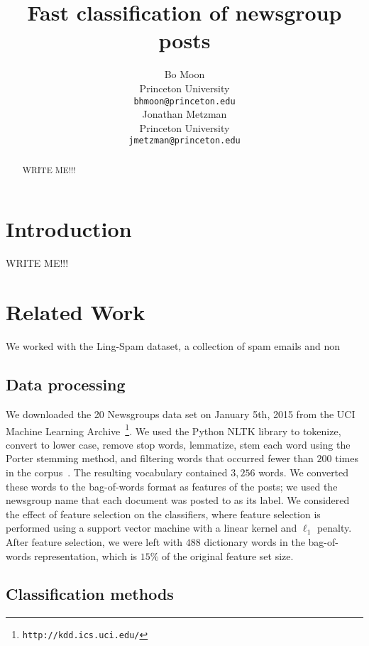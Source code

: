 \documentclass{article} %
\title{Fast classification of newsgroup posts}
\author{
Bo Moon\\
Princeton University\\
\texttt{bhmoon@princeton.edu} \\
\And
Jonathan Metzman\\
Princeton University \\
\texttt{jmetzman@princeton.edu} \\
}
\begin{document}
\maketitle

\begin{abstract}
WRITE ME!!!
\end{abstract}
\section{Introduction}
WRITE ME!!!
\section{Related Work}

We worked with the Ling-Spam dataset, a collection of spam emails and non


\subsection{Data processing}

We downloaded the 20 Newsgroups data set on January 5th, 2015 from the UCI Machine Learning Archive~\footnote{{\tt http://kdd.ics.uci.edu/}}. We used the Python NLTK library to tokenize, convert to lower case, remove stop words, lemmatize, stem each word using the Porter stemming method, and filtering words that occurred fewer than $200$ times in the corpus~\cite{bird2009}. The resulting vocabulary contained $3,256$ words. We converted these words to the bag-of-words format as features of the posts; we used the newsgroup name that each document was posted to as its label. We considered the effect of feature selection on the classifiers, where feature selection is performed using a support vector machine with a linear kernel and $\ell_1$ penalty. After feature selection, we were left with $488$ dictionary words in the bag-of-words representation, which is $15\%$ of the original feature set size.

\subsection{Classification methods}
\end{document}
